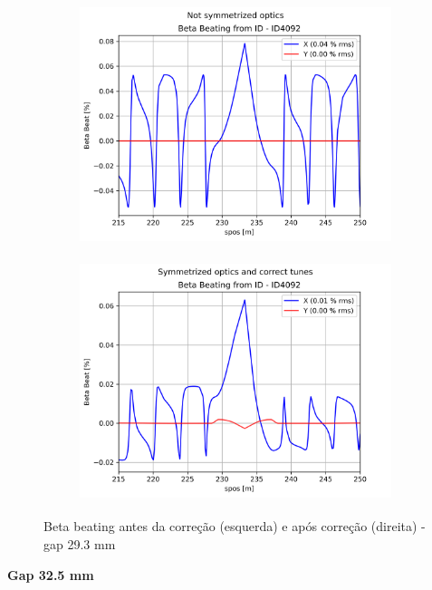 \documentclass[a4paper,12pt]{article}
\begin{document}
\begin{figure}[H]
\begin{subfigure}{0.5\textwidth}
\includegraphics[width=0.9\linewidth, height=7cm]{figs/phase25 gap29 uncorrected-optics.png} 
\label{fig:subim12529}
\end{subfigure}
\begin{subfigure}{0.5\textwidth}
\includegraphics[width=0.9\linewidth, height=7cm]{figs/phase25 gap29 corrected-optics-tunes.png}
\label{fig:subim22529}
\end{subfigure}
\caption{Beta beating antes da correção (esquerda) e após correção (direita) - gap 29.3 mm}
\label{fig:bb25_29}
\end{figure}

\textbf{Gap 32.5 mm} \\
\end{document}
